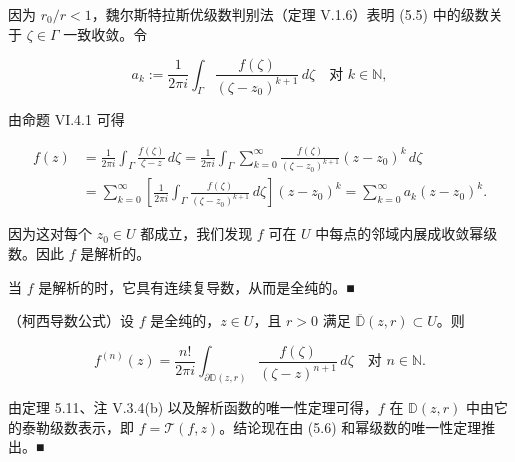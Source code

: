 \begin{theorem}
\begin{subitems}
因为 $ r_{0}/r < 1 $，魏尔斯特拉斯优级数判别法（定理 V.1.6）表明 (5.5) 中的级数关于 $ \zeta \in \Gamma $ 一致收敛。令

\begin{equation}
a_{k} := \frac{1}{2\pi i}\int_{\Gamma}\frac{f(\zeta)}{(\zeta - z_{0})^{k+1}}\,d\zeta \quad \text{对 } k \in \mathbb{N} ,\tag{5.6}
\end{equation}

由命题 VI.4.1 可得

\begin{equation*}
\begin{aligned}
f(z) &= \frac{1}{2\pi i}\int_{\Gamma}\frac{f(\zeta)}{\zeta - z}\,d\zeta = \frac{1}{2\pi i}\int_{\Gamma}\sum_{k=0}^{\infty}\frac{f(\zeta)}{(\zeta - z_{0})^{k+1}}(z - z_{0})^{k}\,d\zeta \\ &= \sum_{k=0}^{\infty}\left[\frac{1}{2\pi i}\int_{\Gamma}\frac{f(\zeta)}{(\zeta - z_{0})^{k+1}}\,d\zeta\right](z - z_{0})^{k} = \sum_{k=0}^{\infty}a_{k}(z - z_{0})^{k} .
\end{aligned}
\end{equation*}

因为这对每个 $ z_{0} \in U $ 都成立，我们发现 $ f $ 可在 $ U $ 中每点的邻域内展成收敛幂级数。因此 $ f $ 是解析的。

\item

当 $ f $ 是解析的时，它具有连续复导数，从而是全纯的。\nobreak\hspace{0.35em}■

\end{subitems}

\end{theorem}

\begin{corollary}

（柯西导数公式）设 $ f $ 是全纯的，$ z \in U $，且 $ r > 0 $ 满足 $ \overline{\mathbb{D}}(z,r) \subset U $。则

\[
f^{(n)}(z) = \frac{n!}{2\pi i}\int_{\partial\mathbb{D}(z,r)}\frac{f(\zeta)}{(\zeta - z)^{n+1}}\,d\zeta \quad \text{对 } n \in \mathbb{N} .
\]

\proofhead
由定理 5.11、注 V.3.4(b) 以及解析函数的唯一性定理可得，$ f $ 在 $ \mathbb{D}(z,r) $ 中由它的泰勒级数表示，即 $ f = \mathcal{T}(f,z) $。结论现在由 (5.6) 和幂级数的唯一性定理推出。\nobreak\hspace{0.35em}■
\end{corollary}

